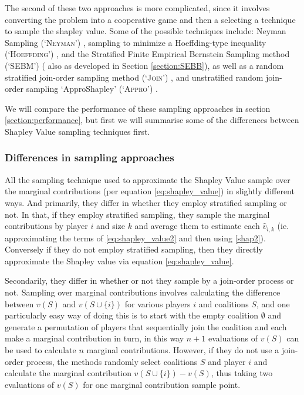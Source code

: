The second of these two approaches is more complicated, since it involves converting the problem into a cooperative game and then a selecting a technique to sample the shapley value.
Some of the possible techniques include: Neyman Sampling (`\textsc{Neyman}') \cite{CASTRO2017180,1938.10503378}, sampling to minimize a Hoeffding-type inequality (`\textsc{Hoeffding}') \cite{2013arXiv1306.4265M}, and the Stratified Finite Empirical Bernstein Sampling method (`SEBM') (\cite{burgess2} also as developed in Section \ref{section:SEBB}), as well as a random stratified join-order sampling method (`\textsc{Join}') \cite{CASTRO2017180}, and unstratified random join-order sampling `ApproShapley' (`\textsc{Appro}') \cite{DBLP:journals/cor/CastroGT09}.

We will compare the performance of these sampling approaches in section \ref{section:performance}, but first we will summarise some of the differences between Shapley Value sampling techniques first.

\subsubsection*{Differences in sampling approaches}

All the sampling technique used to approximate the Shapley Value sample over the marginal contributions (per equation \ref{eq:shapley_value}) in slightly different ways.
And primarily, they differ in whether they employ stratified sampling or not.
In that, if they employ stratified sampling, they sample the marginal contributions by player $i$ and size $k$ and average them to estimate each $\hat{v}_{i,k}$ (ie. approximating the terms of \eqref{eq:shapley_value2} and then using \eqref{shap2}).
Conversely if they do not employ stratified sampling, then they directly approximate the Shapley value via equation \eqref{eq:shapley_value}.

Secondarily, they differ in whether or not they sample by a join-order process or not. Sampling over marginal contributions involves calculating the difference between $v(S)$ and $v(S\cup\{i\})$ for various players $i$ and coalitions $S$, and one particularly easy way of doing this is to start with the empty coalition $\emptyset$ and generate a permutation of players that sequentially join the coalition and each make a marginal contribution in turn, in this way $n+1$ evaluations of $v(S)$ can be used to calculate $n$ marginal contributions.%
However, if they do not use a join-order process, the methods randomly select coalitions $S$ and player $i$ and calculate the marginal contribution $v(S\cup\{i\}) - v(S)$, thus taking two evaluations of $v(S)$ for one marginal contribution sample point.

